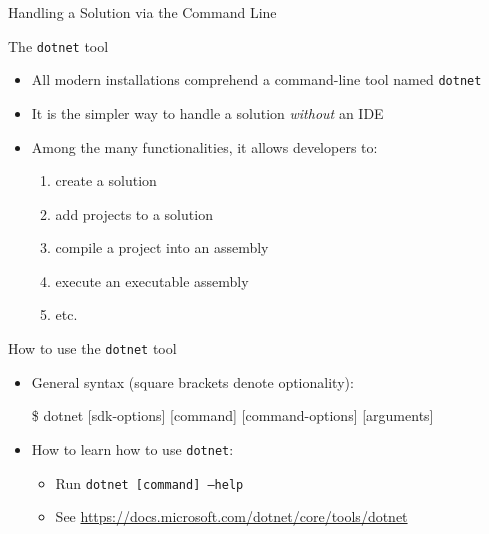 \documentclass[presentation]{beamer}
\begin{document}
\begin{frame}[allowframebreaks]{Handling a Solution via the Command Line}

    \begin{block}{The \texttt{dotnet} tool}
        \begin{itemize}
            \item All modern \dotnet installations comprehend a command-line tool named \alert{\texttt{dotnet}}
            \item It is the simpler way to handle a solution \emph{without} an IDE
            \item Among the many functionalities, it allows developers to:
            \begin{enumerate}
                \item create a solution
                \item add projects to a solution
                \item compile a project into an assembly
                \item execute an executable assembly
                \item etc.
            \end{enumerate} 
        \end{itemize}
    \end{block}

    \begin{block}{How to use the \texttt{dotnet} tool}
        \begin{itemize}
            \item General syntax (square brackets denote optionality):
            \begin{center}\centering\ttfamily\footnotesize
                \alert{\$} dotnet [sdk-options] [command] [command-options] [arguments]
            \end{center}

            \item How to learn how to use \texttt{dotnet}:
            \begin{itemize}
                \item Run \texttt{dotnet [command] --help}
                \item See \url{https://docs.microsoft.com/dotnet/core/tools/dotnet}
            \end{itemize}
        \end{itemize}
    \end{block}


\end{frame}
\end{document}

